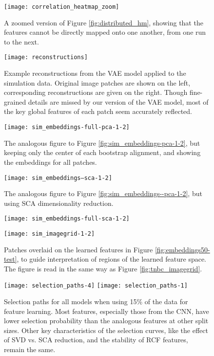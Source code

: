\begin{figure}
\texttt{[image: correlation\_heatmap\_zoom]}
\caption{A zoomed version of Figure \ref{fig:distributed_hm}, showing that the
  features cannot be directly mapped onto one another, from one run to the
  next.}
\label{fig:distributed_hm_subset}
\end{figure}

\begin{figure}
\texttt{[image: reconstructions]}
\caption{Example reconstructions from the VAE model applied to the simulation
  data. Original image patches are shown on the left, corresponding
  reconstructions are given on the right. Though fine-grained details are missed
  by our version of the VAE model, most of the key global features of each patch
  seem accurately reflected.}
\label{fig:reconstructions}
\end{figure}

\begin{figure}
  \centering
  \texttt{[image: sim\_embeddings-full-pca-1-2]}
  \caption{The analogous figure to Figure \ref{fig:sim_embeddings-pca-1-2}, but
    keeping only the center of each bootstrap alignment, and showing the
    embeddings for all patches.}
  \label{fig:sim_embeddings-full-pca-1-2}
\end{figure}

\begin{figure}
  \centering
  \texttt{[image: sim\_embeddings--sca-1-2]}
  \caption{The analogous figure to Figure \ref{fig:sim_embeddings--pca-1-2}, but
    using SCA dimensionality reduction.}
  \label{fig:sim_embeddings--sca-1-2}
\end{figure}

\begin{figure}
  \centering
  \texttt{[image: sim\_embeddings-full-sca-1-2]}
  \caption{}
  \label{sim_embeddings-full-sca-1-2}
\end{figure}

\begin{figure}
  \centering
  \texttt{[image: sim\_imagegrid-1-2]}
  \caption{Patches overlaid on the learned features in Figure
    \ref{fig:embeddings50-test}, to guide interpretation of regions of the
    learned feature space. The figure is read in the same way as Figure
    \ref{fig:tnbc_imagegrid}.}
  \label{fig:sim_imagegrid-1-2}
\end{figure}

\begin{figure}
  \centering
  \texttt{[image: selection\_paths-4]}
  \texttt{[image: selection\_paths-1]}
  \caption{Selection paths for all models when using 15\% of the data for
    feature learning. Most features, especially those from the CNN, have lower selection
    probability than the analogous features at other split sizes. Other key
    characteristics of the selection curves, like the effect of SVD vs. SCA
    reduction, and the stability of RCF features, remain the same.}
  \label{fig:selection_paths15}
\end{figure}

